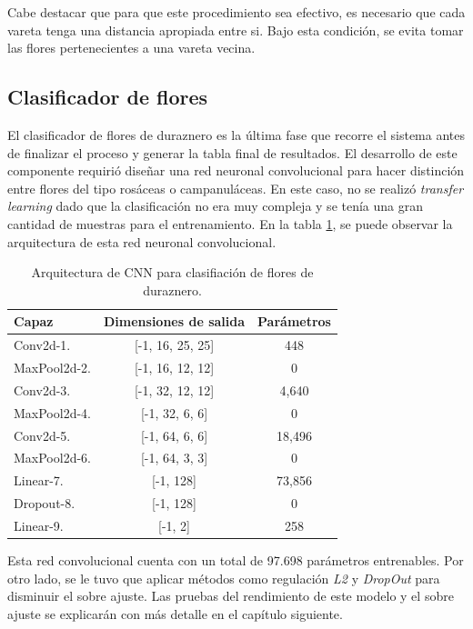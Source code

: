 Cabe destacar que para que este procedimiento sea efectivo, es necesario que cada vareta tenga una distancia apropiada entre si. Bajo esta condición, se evita tomar las flores pertenecientes a una vareta vecina. 

\subsection{Clasificador de flores}

El clasificador de flores de duraznero es la última fase que recorre el sistema antes de finalizar el proceso y generar la tabla final de resultados. El desarrollo de este componente requirió diseñar una red neuronal convolucional para hacer distinción entre flores del tipo rosáceas o campanuláceas. En este caso, no se realizó \textit{transfer learning} dado que la clasificación no era muy compleja y se tenía una gran cantidad de muestras para el entrenamiento. En la tabla \ref{tab:FlowerCNN}, se puede observar la arquitectura de esta red neuronal convolucional.

\begin{table}[h]
	\centering
	\caption{Arquitectura de CNN para clasifiación de flores de duraznero.}
	\begin{tabular}{l c c}    
		\toprule
		\textbf{Capaz}     & \textbf{Dimensiones de salida} & \textbf{Parámetros} \\
		\midrule
		Conv2d-1.          & [-1, 16, 25, 25] &  448\\
		MaxPool2d-2.       & [-1, 16, 12, 12] & 0\\
		Conv2d-3.          & [-1, 32, 12, 12] & 4,640 \\
		MaxPool2d-4.       & [-1, 32, 6, 6]   & 0 \\
		Conv2d-5.          & [-1, 64, 6, 6]   & 18,496 \\
		MaxPool2d-6.       & [-1, 64, 3, 3]   & 0 \\	
		Linear-7.          & [-1, 128]        & 73,856 \\
		Dropout-8.         & [-1, 128]        & 0 \\
		Linear-9.          & [-1, 2]          & 258 \\	
		\bottomrule
		\hline
	\end{tabular}
	\label{tab:FlowerCNN}
\end{table}  

Esta red convolucional cuenta con un total de 97.698 parámetros entrenables. Por otro lado, se le tuvo que aplicar métodos como regulación \textit{L2} y \textit{DropOut} para disminuir el sobre ajuste. Las pruebas del rendimiento de este modelo y el sobre ajuste se explicarán con más detalle en el capítulo siguiente.


